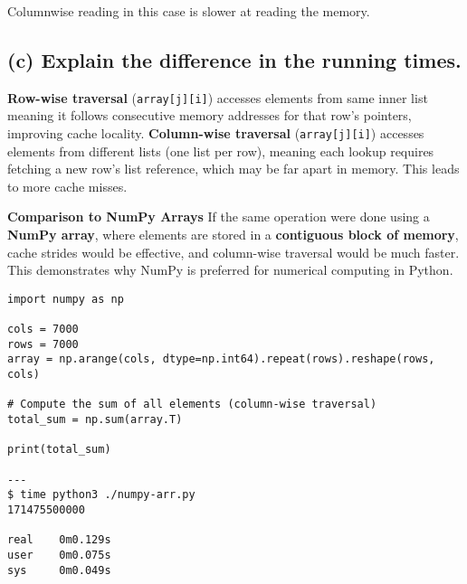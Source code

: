 \documentclass{article}
\begin{document}
Columnwise reading in this case is slower at reading the memory.

\subsection*{(c) Explain the difference in the running times.}
\textbf{Row-wise traversal} (\texttt{array[j][i]}) accesses elements from 
same inner list meaning it follows consecutive memory addresses for that row's pointers,
improving cache locality.
\textbf{Column-wise traversal} (\texttt{array[j][i]}) accesses elements from different
lists (one list per row), meaning each lookup requires fetching a new row's list
reference, which may be far apart in memory. This leads to more cache misses.

\bigskip

{\scriptsize
\textbf{Comparison to NumPy Arrays}
If the same operation were done using a \textbf{NumPy array}, where elements are stored in a \textbf{contiguous block of memory}, cache strides would be effective, and column-wise traversal would be much faster. This demonstrates why NumPy is preferred for numerical computing in Python.
\begin{verbatim}
import numpy as np

cols = 7000
rows = 7000
array = np.arange(cols, dtype=np.int64).repeat(rows).reshape(rows, cols)

# Compute the sum of all elements (column-wise traversal)
total_sum = np.sum(array.T)

print(total_sum)

---
$ time python3 ./numpy-arr.py 
171475500000

real    0m0.129s
user    0m0.075s
sys     0m0.049s
\end{verbatim}
}
\end{document}
